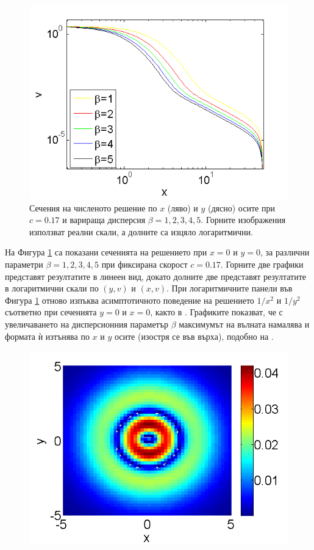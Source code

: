 \documentclass[a4paper]{article}
\theoremstyle{remark}
\begin{document}
\begin{large}
\begin{figure}[ht]
\begin{minipage}[b]{0.5\linewidth}
		 \includegraphics[width=\linewidth]{SolutionProfiles/ChristovIVLogY=0_ZB2_bt1_5_c017_h020_O(h^6).png}
	\end{minipage}
	\caption{Сечения на численото решение по $x$ (ляво) и $y$ (дясно) осите при $c=0.17$ и варираща дисперсия $\beta=1,2,3,4,5$. Горните изображения използват реални скали, а долните са изцяло логаритмични.}
	\label{profilesDispVarying}
\end{figure}
На Фигура \ref{profilesDispVarying} са показани сеченията на решението при $x=0$ и $y=0$, за различни параметри $\beta=1, 2, 3, 4, 5$ при фиксирана скорост $c=0.17$. Горните две графики представят резултатите в линеен вид, докато долните две представят резултатите в логаритмични скали по $(y,v)$ и $(x,v)$. При логаритмичните панели във Фигура \ref{profilesDispVarying} отново изпъква асимптотичното поведение на решението $1/x^2$ и $1/y^2$ съответно при сеченията $y=0$ и $x=0$, както в \cite{ref15, ref117, ref116}. Графиките показват, че с увеличаването на дисперсионния параметър $\beta$ максимумът на вълната намалява и формата ѝ изтънява по $x$ и $y$ осите (изостря се във върха), подобно на \cite{ref15, ref117, ref116}.
\begin{figure}[htbp]
	\begin{minipage}[b]{0.48\linewidth}
		\raggedleft
		\includegraphics[width=\linewidth]{BestFitVsSimpleIter/ChristovIC_50_bt1_c017_h02_O(h^6).png}

\end{minipage}
\end{figure}
\end{large}
\end{document}
